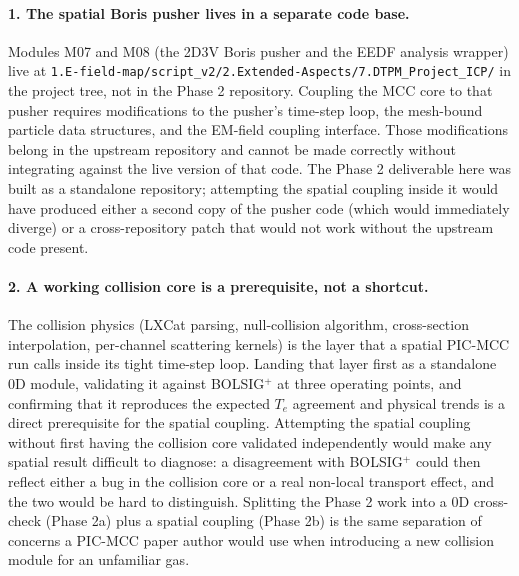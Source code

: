 \documentclass[11pt,a4paper]{article}
\begin{document}
\paragraph{1. The spatial Boris pusher lives in a separate code
base.} Modules M07 and M08 (the 2D3V Boris pusher and the EEDF
analysis wrapper) live at
\texttt{1.E-field-map/script\_v2/2.Extended-Aspects/7.DTPM\_Project\_ICP/}
in the project tree, not in the Phase 2 repository. Coupling the MCC
core to that pusher requires modifications to the pusher's time-step
loop, the mesh-bound particle data structures, and the EM-field
coupling interface. Those modifications belong in the upstream
repository and cannot be made correctly without integrating against
the live version of that code. The Phase 2 deliverable here was
built as a standalone repository; attempting the spatial coupling
inside it would have produced either a second copy of the pusher
code (which would immediately diverge) or a cross-repository
patch that would not work without the upstream code present.

\paragraph{2. A working collision core is a prerequisite, not a
shortcut.} The collision physics (LXCat parsing, null-collision
algorithm, cross-section interpolation, per-channel scattering
kernels) is the layer that a spatial PIC-MCC run calls inside its
tight time-step loop. Landing that layer first as a standalone 0D
module, validating it against BOLSIG$^+$ at three operating points,
and confirming that it reproduces the expected $T_e$ agreement and
physical trends is a direct prerequisite for the spatial coupling.
Attempting the spatial coupling without first having the collision
core validated independently would make any spatial result
difficult to diagnose: a disagreement with BOLSIG$^+$ could then
reflect either a bug in the collision core or a real non-local
transport effect, and the two would be hard to distinguish.
Splitting the Phase 2 work into a 0D cross-check (Phase 2a) plus a
spatial coupling (Phase 2b) is the same separation of concerns a
PIC-MCC paper author would use when introducing a new collision
module for an unfamiliar gas.
\end{document}
